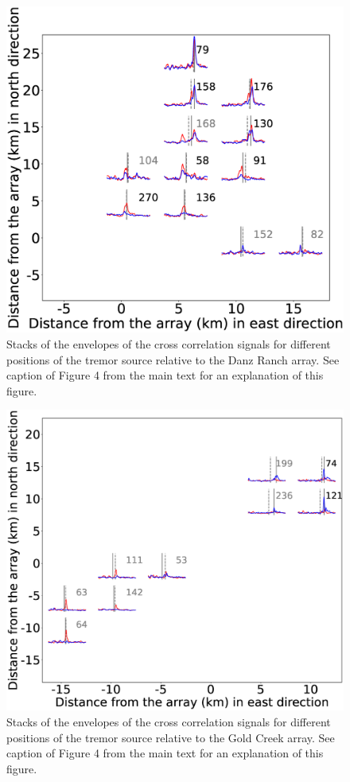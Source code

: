 \documentclass[draft]{agujournal2019}
\begin{document}
\begin{figure}
\noindent\includegraphics[width=\textwidth, trim={1cm 0.5cm 2.5cm 1.5cm},clip]{figures/DR_PWS_PWS_0.eps}
\caption{Stacks of the envelopes of the cross correlation signals for different positions of the tremor source relative to the Danz Ranch array. See caption of Figure 4 from the main text for an explanation of this figure.}
\label{pngfiguresample}
\end{figure}

\begin{figure}
\noindent\includegraphics[width=\textwidth, trim={1.5cm 1cm 4.5cm 4cm},clip]{figures/GC_PWS_PWS_0.eps}
\caption{Stacks of the envelopes of the cross correlation signals for different positions of the tremor source relative to the Gold Creek array. See caption of Figure 4 from the main text for an explanation of this figure.}
\label{pngfiguresample}
\end{figure}
\end{document}
